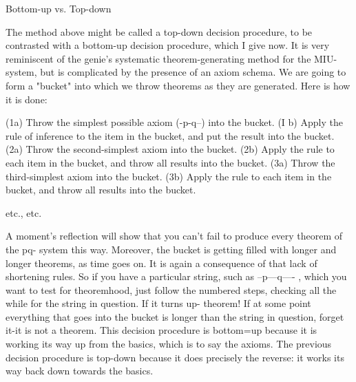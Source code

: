 Bottom-up vs. Top-down 

The method above might be called a top-down decision procedure, to be contrasted with a bottom-up decision procedure, which I give now. It is very reminiscent of the genie's systematic theorem-generating method for the MIU-system, but is complicated by the presence of an axiom schema. We are going to form a "bucket" into which we throw theorems as they are generated. Here is how it is done: 







(1a) Throw the simplest possible axiom (-p-q--) into the bucket. (I b) Apply the rule of inference to the item in the bucket, and put the result into the bucket. (2a) Throw the second-simplest axiom into the bucket. (2b) Apply the rule to each item in the bucket, and throw all results into the bucket. (3a) Throw the third-simplest axiom into the bucket. (3b) Apply the rule to each item in the bucket, and throw all results into the bucket. 

etc., etc. 

A moment's reflection will show that you can't fail to produce every theorem of the pq- system this way. Moreover, the bucket is getting filled with longer and longer theorems, as time goes on. It is again a consequence of that lack of shortening rules. So if you have a particular string, such as --p---q---- , which you want to test for theoremhood, just follow the numbered steps, checking all the while for the string in question. If it turns up- theorem! If at some point everything that goes into the bucket is longer than the string in question, forget it-it is not a theorem. This decision procedure is bottom=up because it is working its way up from the basics, which is to say the axioms. The previous decision procedure is top-down because it does precisely the reverse: it works its way back down towards the basics. 

